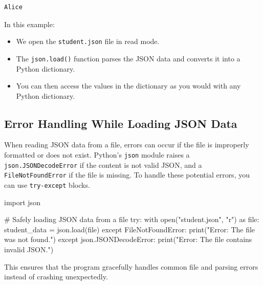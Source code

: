 \documentclass[
  letterpaper,
  DIV=11,
  numbers=noendperiod]{scrreprt}
\newenvironment{Shaded}{\begin{snugshade}}{\end{snugshade}}
\newcommand{\BuiltInTok}[1]{\textcolor[rgb]{0.00,0.23,0.31}{#1}}
\newcommand{\CommentTok}[1]{\textcolor[rgb]{0.37,0.37,0.37}{#1}}
\newcommand{\ControlFlowTok}[1]{\textcolor[rgb]{0.00,0.23,0.31}{#1}}
\newcommand{\ImportTok}[1]{\textcolor[rgb]{0.00,0.46,0.62}{#1}}
\newcommand{\NormalTok}[1]{\textcolor[rgb]{0.00,0.23,0.31}{#1}}
\newcommand{\OperatorTok}[1]{\textcolor[rgb]{0.37,0.37,0.37}{#1}}
\newcommand{\PreprocessorTok}[1]{\textcolor[rgb]{0.68,0.00,0.00}{#1}}
\newcommand{\StringTok}[1]{\textcolor[rgb]{0.13,0.47,0.30}{#1}}
\providecommand{\tightlist}{%
  \setlength{\itemsep}{0pt}\setlength{\parskip}{0pt}}\usepackage{longtable,booktabs,array}
\begin{document}
\begin{verbatim}
Alice
\end{verbatim}

In this example:

\begin{itemize}
\tightlist
\item
  We open the \texttt{student.json} file in read mode.
\item
  The \texttt{json.load()} function parses the JSON data and converts it
  into a Python dictionary.
\item
  You can then access the values in the dictionary as you would with any
  Python dictionary.
\end{itemize}

\hypertarget{error-handling-while-loading-json-data}{%
\subsection{Error Handling While Loading JSON
Data}\label{error-handling-while-loading-json-data}}

When reading JSON data from a file, errors can occur if the file is
improperly formatted or does not exist. Python's \texttt{json} module
raises a \texttt{json.JSONDecodeError} if the content is not valid JSON,
and a \texttt{FileNotFoundError} if the file is missing. To handle these
potential errors, you can use \texttt{try-except} blocks.

\begin{Shaded}
\begin{Highlighting}[]
\ImportTok{import}\NormalTok{ json}

\CommentTok{\# Safely loading JSON data from a file}
\ControlFlowTok{try}\NormalTok{:}
    \ControlFlowTok{with} \BuiltInTok{open}\NormalTok{(}\StringTok{"student.json"}\NormalTok{, }\StringTok{"r"}\NormalTok{) }\ImportTok{as} \BuiltInTok{file}\NormalTok{:}
\NormalTok{        student\_data }\OperatorTok{=}\NormalTok{ json.load(}\BuiltInTok{file}\NormalTok{)}
\ControlFlowTok{except} \PreprocessorTok{FileNotFoundError}\NormalTok{:}
    \BuiltInTok{print}\NormalTok{(}\StringTok{"Error: The file was not found."}\NormalTok{)}
\ControlFlowTok{except}\NormalTok{ json.JSONDecodeError:}
    \BuiltInTok{print}\NormalTok{(}\StringTok{"Error: The file contains invalid JSON."}\NormalTok{)}
\end{Highlighting}
\end{Shaded}

This ensures that the program gracefully handles common file and parsing
errors instead of crashing unexpectedly.
\end{document}
